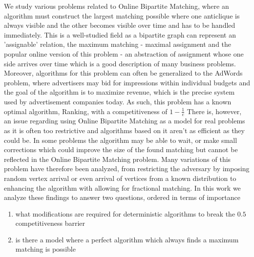 We study various problems related to Online Bipartite Matching, where an algorithm must construct the largest matching possible where one anticlique is always visible and the other becomes visible over time and has to be handled immediately.
This is a well-studied field as a bipartite graph can represent an 'assignable' relation, the maximum matching - maximal assignment and the popular online version of this problem - an abstraction of assignment whose one side arrives over time which is a good description of many business problems.
Moreover, algorithms for this problem can often be generalized to the AdWords problem, where advertisers may bid for impressions within individual budgets and the goal of the algorithm is to maximize revenue, which is the precise system used by advertisement companies today.
As such, this problem has a known optimal algorithm, Ranking, with a competitiveness of $1-\frac{1}{e}$
There is, however, an issue regarding using Online Bipartite Matching as a model for real problems as it is often too restrictive and algorithms based on it aren't as efficient as they could be. In some problems the algorithm may be able to wait, or make small corrections which could improve the size of the found matching but cannot be reflected in the Online Bipartite Matching problem.
Many variations of this problem have therefore been analyzed, from restricting the adversary by imposing random vertex arrival or even arrival of vertices from a known distribution to enhancing the algorithm with allowing for fractional matching.
In this work we analyze these findings to answer two questions, ordered in terms of importance
\begin{enumerate}
	\item what modifications are required for deterministic algorithms to break the $0.5$ competitiveness barrier
	\item is there a model where a perfect algorithm which always finds a maximum matching is possible
\end{enumerate}